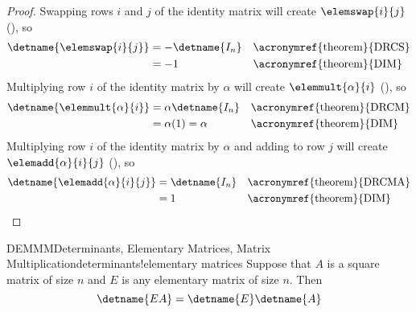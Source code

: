 %
\begin{proof}
Swapping rows $i$ and $j$ of the identity matrix will create $\elemswap{i}{j}$  (), so 
%
\begin{align*}
\detname{\elemswap{i}{j}}
&=-\detname{I_n}&&\text{\acronymref{theorem}{DRCS}}\\
%
&=-1&&\text{\acronymref{theorem}{DIM}}\\
%
\end{align*}
Multiplying row $i$ of the identity matrix by $\alpha$ will create $\elemmult{\alpha}{i}$ (), so 
%
\begin{align*}
\detname{\elemmult{\alpha}{i}}
&=\alpha\detname{I_n}&&\text{\acronymref{theorem}{DRCM}}\\
%
&=\alpha(1)=\alpha&&\text{\acronymref{theorem}{DIM}}\\
%
\end{align*}
Multiplying row $i$ of the identity matrix by $\alpha$ and adding to row $j$ will create $\elemadd{\alpha}{i}{j}$ (), so
%
\begin{align*}
\detname{\elemadd{\alpha}{i}{j}}
&=\detname{I_n}&&\text{\acronymref{theorem}{DRCMA}}\\
%
&=1&&\text{\acronymref{theorem}{DIM}}\\
%
\end{align*}
\end{proof}
%
%
\begin{theorem}{DEMMM}{Determinants, Elementary Matrices, Matrix Multiplication}{determinants!elementary matrices}
Suppose that $A$ is a square matrix of size $n$ and $E$ is any elementary matrix of size $n$.  Then 
%
\begin{equation*}
\detname{EA}=\detname{E}\detname{A}
\end{equation*}
%
\end{theorem}
%
